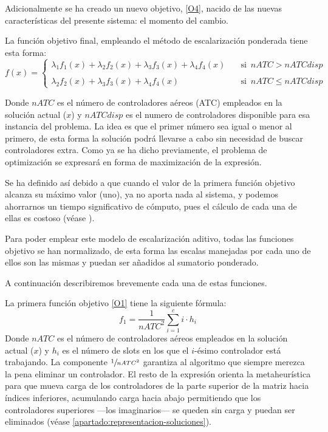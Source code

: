 Adicionalmente se ha creado un nuevo objetivo, \ref{O4}, nacido de las nuevas características del presente sistema: el momento del cambio.


La función objetivo final, empleando el método de escalarización ponderada tiene esta forma:
\[
	f(x)= 
	\begin{cases}
		\lambda_1 f_1(x) + \lambda_2 f_2(x) + \lambda_3 f_3(x) + \lambda_4 f_4(x) & \quad \textrm{si } \, nATC > nATCdisp  \\
		\\
		\lambda_2 f_2(x) + \lambda_3 f_3(x) + \lambda_4 f_4(x)                    & \quad \textrm{si } \,  nATC \le nATCdisp
	\end{cases}
\]

Donde $nATC$ es el número de controladores aéreos (\gls{ATC}) empleados en la solución actual ($x$) y $nATCdisp$ es el numero de controladores disponible para esa instancia del problema. La idea es que el primer número sea igual o menor al primero, de esta forma la solución podrá llevarse a cabo sin necesidad de buscar controladores extra. Como ya se ha dicho previamente, el problema de optimización se expresará en forma de maximización de la expresión.

Se ha definido así debido a que cuando el valor de la primera función objetivo alcanza su máximo valor (uno), ya no aporta nada al sistema, y podemos ahorrarnos un tiempo significativo de cómputo, pues el cálculo de cada una de ellas es costoso (véase ).%

Para poder emplear este modelo de escalarización aditivo, todas las funciones objetivo se han normalizado, de esta forma las escalas manejadas por cada uno de ellos son las mismas y puedan ser añadidos al sumatorio ponderado.

A continuación describiremos brevemente cada una de estas funciones.

La primera función objetivo \ref{O1} tiene la siguiente fórmula:
\[ f_1 = \frac{1}{nATC^2} \sum_{i=1}^c i\cdot h_i \]
Donde $nATC$ es el número de controladores aéreos empleados en la solución actual ($x$) y $h_i$ es el número de slots en los que el $i$-ésimo controlador está trabajando. La componente $\sfrac{1}{nATC^2}$ garantiza al algoritmo que siempre merezca la pena eliminar un controlador. El resto de la expresión orienta la metaheurística para que mueva carga de los controladores de la parte superior de la matriz hacia índices inferiores, acumulando carga hacia abajo permitiendo que los controladores superiores ---los imaginarios--- se queden sin carga y puedan ser eliminados (véase \autoref{apartado:representacion-soluciones}).

